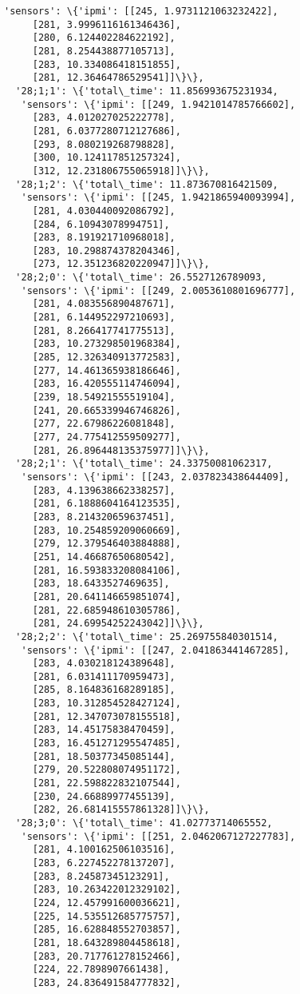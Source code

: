\documentclass[11pt]{article}
\begin{document}
\begin{tcolorbox}[breakable, size=fbox, boxrule=.5pt, pad at break*=1mm, opacityfill=0]
\begin{Verbatim}[commandchars=\\\{\}]
   'sensors': \{'ipmi': [[245, 1.9731121063232422],
     [281, 3.9996116161346436],
     [280, 6.124402284622192],
     [281, 8.254438877105713],
     [283, 10.334086418151855],
     [281, 12.36464786529541]]\}\},
  '28;1;1': \{'total\_time': 11.856993675231934,
   'sensors': \{'ipmi': [[249, 1.9421014785766602],
     [283, 4.012027025222778],
     [281, 6.0377280712127686],
     [293, 8.080219268798828],
     [300, 10.124117851257324],
     [312, 12.231806755065918]]\}\},
  '28;1;2': \{'total\_time': 11.873670816421509,
   'sensors': \{'ipmi': [[245, 1.9421865940093994],
     [281, 4.030440092086792],
     [284, 6.10943078994751],
     [283, 8.191921710968018],
     [283, 10.298874378204346],
     [273, 12.351236820220947]]\}\},
  '28;2;0': \{'total\_time': 26.5527126789093,
   'sensors': \{'ipmi': [[249, 2.0053610801696777],
     [281, 4.083556890487671],
     [281, 6.144952297210693],
     [281, 8.266417741775513],
     [283, 10.273298501968384],
     [285, 12.326340913772583],
     [277, 14.461365938186646],
     [283, 16.420555114746094],
     [239, 18.54921555519104],
     [241, 20.665339946746826],
     [277, 22.67986226081848],
     [277, 24.775412559509277],
     [281, 26.896448135375977]]\}\},
  '28;2;1': \{'total\_time': 24.33750081062317,
   'sensors': \{'ipmi': [[243, 2.037823438644409],
     [283, 4.139638662338257],
     [281, 6.1888604164123535],
     [283, 8.214320659637451],
     [283, 10.254859209060669],
     [279, 12.379546403884888],
     [251, 14.46687650680542],
     [281, 16.593833208084106],
     [283, 18.6433527469635],
     [281, 20.641146659851074],
     [281, 22.685948610305786],
     [281, 24.69954252243042]]\}\},
  '28;2;2': \{'total\_time': 25.269755840301514,
   'sensors': \{'ipmi': [[247, 2.041863441467285],
     [283, 4.030218124389648],
     [281, 6.031411170959473],
     [285, 8.164836168289185],
     [283, 10.312854528427124],
     [281, 12.347073078155518],
     [283, 14.45175838470459],
     [283, 16.451271295547485],
     [281, 18.50377345085144],
     [279, 20.522808074951172],
     [281, 22.598822832107544],
     [230, 24.66889977455139],
     [282, 26.681415557861328]]\}\},
  '28;3;0': \{'total\_time': 41.02773714065552,
   'sensors': \{'ipmi': [[251, 2.0462067127227783],
     [281, 4.100162506103516],
     [283, 6.227452278137207],
     [283, 8.24587345123291],
     [283, 10.263422012329102],
     [224, 12.457991600036621],
     [225, 14.535512685775757],
     [285, 16.628848552703857],
     [281, 18.643289804458618],
     [283, 20.717761278152466],
     [224, 22.7898907661438],
     [283, 24.836491584777832],

\end{Verbatim}
\end{tcolorbox}
\end{document}
